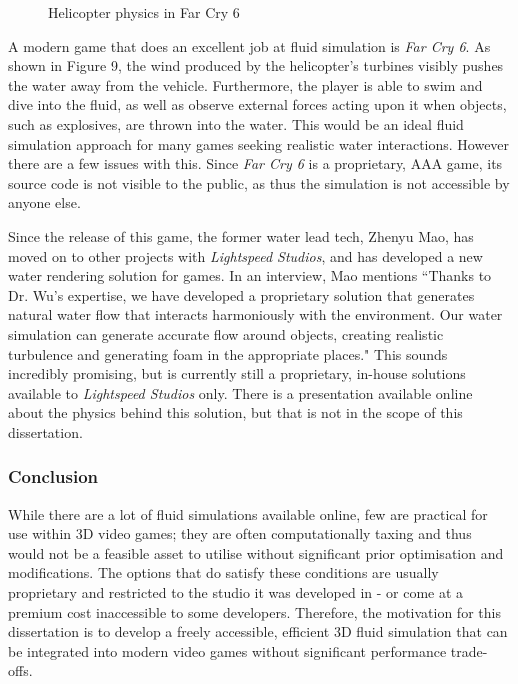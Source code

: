 \documentclass[a4paper, 12pt]{article}
\newcommand{\wideimage}[2][]{%
  \makebox[\textwidth][c]{\texttt{[image: \#2]}}%
}
\begin{document}
    \begin{figure}[H]
        \wideimage[]{farCry6.png}
        \caption{Helicopter physics in Far Cry 6 \cite{farcry6video}}
    \end{figure}

    A modern game that does an excellent job at fluid simulation is \textit{Far Cry 6}. As shown in Figure 9, the wind produced by the helicopter's turbines visibly pushes the water away from the vehicle. Furthermore, the player is able to swim and dive into the fluid, as well as observe external forces acting upon it when objects, such as explosives, are thrown into the water. This would be an ideal fluid simulation approach for many games seeking realistic water interactions. However there are a few issues with this. Since \textit{Far Cry 6} is a proprietary, AAA game, its source code is not visible to the public, as thus the simulation is not accessible by anyone else.
    
    Since the release of this game, the former water lead tech, Zhenyu Mao, has moved on to other projects with \textit{Lightspeed Studios}, and has developed a new water rendering solution for games. In an interview\cite{zhenyu}, Mao mentions ``Thanks to Dr. Wu's expertise, we have developed a proprietary solution that generates natural water flow that interacts harmoniously with the environment. Our water simulation can generate accurate flow around objects, creating realistic turbulence and generating foam in the appropriate places." This sounds incredibly promising, but is currently still a proprietary, in-house solutions available to \textit{Lightspeed Studios} only. There is a presentation available online about the physics behind this solution\cite{zhenyupresent}, but that is not in the scope of this dissertation.

    \subsubsection{Conclusion}

    While there are a lot of fluid simulations available online, few are practical for use within 3D video games; they are often computationally taxing and thus would not be a feasible asset to utilise without significant prior optimisation and modifications. The options that do satisfy these conditions are usually proprietary and restricted to the studio it was developed in - or come at a premium cost inaccessible to some developers. Therefore, the motivation for this dissertation is to develop a freely accessible, efficient 3D fluid simulation that can be integrated into modern video games without significant performance trade-offs.
\end{document}
